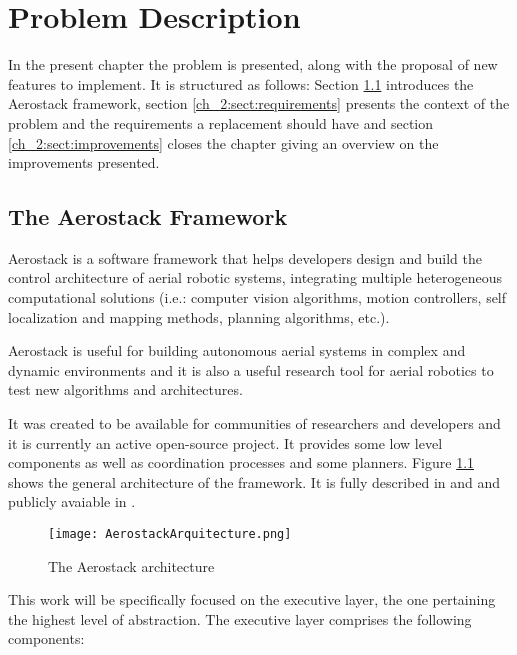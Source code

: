 \chapter{Problem Description} \label{ch_2:chapter}

In the present chapter the problem is presented, along with the proposal of new features to implement. It is structured as follows: Section \ref{ch_2:sect:aerostack} introduces the Aerostack framework, section \ref{ch_2:sect:requirements} presents the context of the problem and the requirements a replacement should have and section \ref{ch_2:sect:improvements} closes the chapter giving an overview on the improvements presented.

  \section{The Aerostack Framework} \label{ch_2:sect:aerostack}

    Aerostack is a software framework that helps developers design and build the control architecture of aerial robotic systems, integrating multiple heterogeneous computational solutions (i.e.: computer vision algorithms, motion controllers, self localization and mapping methods, planning algorithms, etc.).

    Aerostack is useful for building autonomous aerial systems in complex and dynamic environments and it is also a useful research tool for aerial robotics to test new algorithms and architectures.

    It was created to be available for communities of researchers and developers and it is currently an active open-source project. It provides some low level components as well as coordination processes and some planners. Figure \ref{ch_2:fig:aerostack_arqu} shows the general architecture of the framework. It is fully described in \cite{7502591} and \cite{Sanchez-Lopez2017} and publicly avaiable in \cite{aerostack_wiki_web}.

    \pagebreak
    \begin{figure}[ht]
      \centering
      \texttt{[image: AerostackArquitecture.png]}
      \caption{The Aerostack architecture}
      \label{ch_2:fig:aerostack_arqu}
    \end{figure}

    This work will be specifically focused on the executive layer, the one pertaining the highest level of abstraction. The executive layer comprises the following components:

